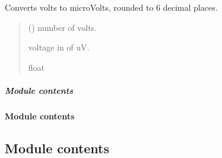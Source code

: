 \documentclass[letterpaper,10pt,english]{sphinxmanual}
\begin{document}
\begin{fulllineitems}
\begin{fulllineitems}
\label{\detokenize{Morelia.Stream.PodHandler:Morelia.Stream.PodHandler.HandlerInterface.DrainDeviceHandler._uV}}
\pysigstartsignatures
{}
\pysigstopsignatures
\sphinxAtStartPar
Converts volts to microVolts, rounded to 6 decimal places.
\begin{quote}\begin{description}
\sphinxAtStartPar
{} (\sphinxstyleliteralemphasis{\sphinxupquote{ | }}) \textendash{} number of volts.

\sphinxAtStartPar
voltage in of uV.

\sphinxAtStartPar
float

\end{description}\end{quote}

\end{fulllineitems}


\end{fulllineitems}



\subparagraph{Module contents}
\label{\detokenize{Morelia.Stream.PodHandler:module-Morelia.Stream.PodHandler}}\label{\detokenize{Morelia.Stream.PodHandler:module-contents}}

\paragraph{Module contents}
\label{\detokenize{Morelia.Stream:module-Morelia.Stream}}\label{\detokenize{Morelia.Stream:module-contents}}

\subsection{Module contents}
\label{\detokenize{Morelia:module-Morelia}}\label{\detokenize{Morelia:module-contents}}
\sphinxstepscope
\end{document}
